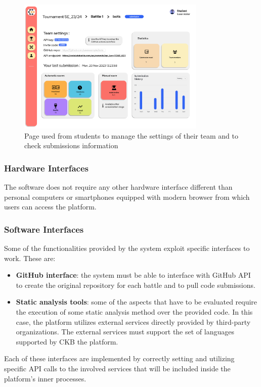 \begin{figure}[H]
    \centering
    \includegraphics[width=0.8\textwidth]{Mockups/15_student_team.png}
    \caption{Page used from students to manage the settings of their team and to check submissions information}
\end{figure}

\subsubsection{Hardware Interfaces}
The software does not require any other hardware interface different than personal computers or smartphones equipped with modern browser from which users can access the platform.
\subsubsection{Software Interfaces}
Some of the functionalities provided by the system exploit specific interfaces to work. These are:
\begin{itemize}
    \item \textbf{GitHub interface}: the system must be able to interface with GitHub API to create the original repository for each battle and to pull code submissions.
    \item \textbf{Static analysis tools}: some of the aspects that have to be evaluated require the execution of some static analysis method over the provided code. In this case, the platform utilizes external services directly provided by third-party organizations. The external services must support the set of languages supported by CKB the platform.
\end{itemize}
Each of these interfaces are implemented by correctly setting and utilizing specific API calls to the involved services that will be included inside the platform’s inner processes.

